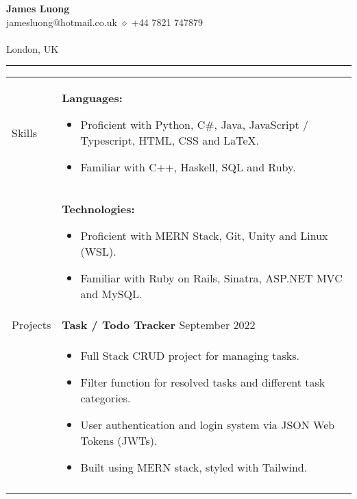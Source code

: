 \documentclass[12pt]{article}
\begin{document}
\begin{minipage}[t][0pt]{\linewidth} %
\begin{center}
	{\LARGE\textbf{James Luong}} \\
	jamesluong@hotmail.co.uk $\diamond$ +44 7821 747879 \\
	
	\href{https://jluong23.github.io/blog}{\color{Blue}{jluong23.github.io/blog}} \\
	
	London, UK \\
	\hrule
\end{center}


\begin{tabular}[t]{p{2cm} p{14cm}}
	{Skills} &
		\textbf{Languages:} 
	    \begin{itemize}
    		\renewcommand{\labelitemi}{$\diamond$}
    			\item Proficient with Python, C\#, Java, JavaScript / Typescript, HTML, CSS and \LaTeX. 
    			\item Familiar with C++, Haskell, SQL and Ruby.
		\end{itemize} \\ &

		\textbf{Technologies:} 
	    \begin{itemize}
    		\renewcommand{\labelitemi}{$\diamond$}
    			\item Proficient with MERN Stack, Git, Unity and Linux (WSL).
    			\item Familiar with Ruby on Rails, Sinatra, ASP.NET MVC and MySQL.
		\end{itemize} \\

	{Projects} &
		\textbf{Task / Todo Tracker}  \hfill September 2022 \\ &
		\begin{itemize}
			\renewcommand{\labelitemi}{$\diamond$}
			\item Full Stack CRUD project for managing tasks.
			\item Filter function for resolved tasks and different task categories.
			\item User authentication and login system via JSON Web Tokens (JWTs).
			\item Built using MERN stack, styled with Tailwind.
		\end{itemize} \\ &
		

\end{tabular}
\end{minipage}
\end{document}
